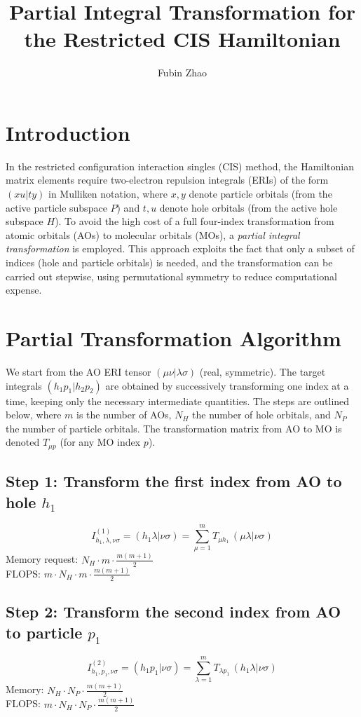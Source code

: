 \documentclass[12pt]{article}
\title{Partial Integral Transformation for the Restricted CIS Hamiltonian}
\author{Fubin Zhao}
\date{}
\begin{document}
\maketitle

\section{Introduction}

In the restricted configuration interaction singles (CIS) method, the Hamiltonian matrix elements require two-electron repulsion integrals (ERIs) of the form \((x u | t y)\) in Mulliken notation, where \(x, y\) denote particle orbitals (from the active particle subspace \(P\)) and \(t, u\) denote hole orbitals (from the active hole subspace \(H\)). To avoid the high cost of a full four-index transformation from atomic orbitals (AOs) to molecular orbitals (MOs), a \emph{partial integral transformation} is employed. This approach exploits the fact that only a subset of indices (hole and particle orbitals) is needed, and the transformation can be carried out stepwise, using permutational symmetry to reduce computational expense.

\section{Partial Transformation Algorithm}

We start from the AO ERI tensor \((\mu\nu|\lambda\sigma)\) (real, symmetric). The target integrals \((h_1 p_1 | h_2 p_2)\) are obtained by successively transforming one index at a time, keeping only the necessary intermediate quantities. The steps are outlined below, where \(m\) is the number of AOs, \(N_H\) the number of hole orbitals, and \(N_P\) the number of particle orbitals. The transformation matrix from AO to MO is denoted \(T_{\mu p}\) (for any MO index \(p\)).

\subsection{Step 1: Transform the first index from AO to hole \(h_1\)}
\[
I^{(1)}_{h_1,\lambda,\nu\sigma} = (h_1\lambda|\nu\sigma) = \sum_{\mu=1}^{m} T_{\mu h_1}\, (\mu\lambda|\nu\sigma)
\]
Memory request: \(N_H \cdot m \cdot \frac{m(m+1)}{2}\) \\
FLOPS: \(m \cdot N_H \cdot m \cdot \frac{m(m+1)}{2}\)

\subsection{Step 2: Transform the second index from AO to particle \(p_1\)}
\[
I^{(2)}_{h_1,p_1,\nu\sigma} = (h_1 p_1|\nu\sigma) = \sum_{\lambda=1}^{m} T_{\lambda p_1}\, (h_1\lambda|\nu\sigma)
\]
Memory: \(N_H \cdot N_P \cdot \frac{m(m+1)}{2}\) \\
FLOPS: \(m \cdot N_H \cdot N_P \cdot \frac{m(m+1)}{2}\)
\end{document}
